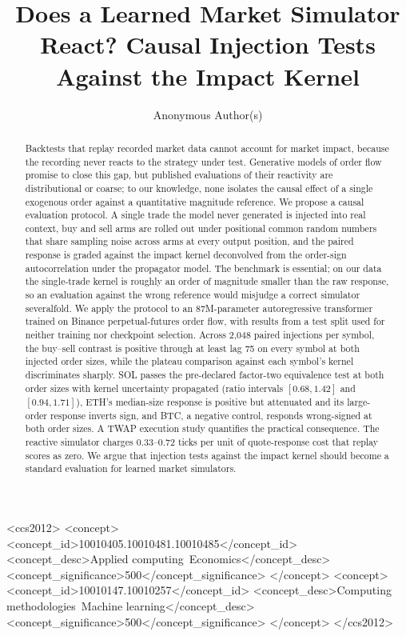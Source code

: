 \documentclass[sigconf,anonymous]{acmart}
\begin{document}
\title{Does a Learned Market Simulator React? Causal Injection Tests Against the Impact Kernel}

\author{Anonymous Author(s)}

\begin{abstract}
Backtests that replay recorded market data cannot account for market impact, because the recording never reacts to the strategy under test. Generative models of order flow promise to close this gap, but published evaluations of their reactivity are distributional or coarse; to our knowledge, none isolates the causal effect of a single exogenous order against a quantitative magnitude reference. We propose a causal evaluation protocol. A single trade the model never generated is injected into real context, buy and sell arms are rolled out under positional common random numbers that share sampling noise across arms at every output position, and the paired response is graded against the impact kernel deconvolved from the order-sign autocorrelation under the propagator model. The benchmark is essential; on our data the single-trade kernel is roughly an order of magnitude smaller than the raw response, so an evaluation against the wrong reference would misjudge a correct simulator severalfold. We apply the protocol to an 87M-parameter autoregressive transformer trained on Binance perpetual-futures order flow, with results from a test split used for neither training nor checkpoint selection. Across 2{,}048 paired injections per symbol, the buy--sell contrast is positive through at least lag 75 on every symbol at both injected order sizes, while the plateau comparison against each symbol's kernel discriminates sharply. SOL passes the pre-declared factor-two equivalence test at both order sizes with kernel uncertainty propagated (ratio intervals $[0.68, 1.42]$ and $[0.94, 1.71]$), ETH's median-size response is positive but attenuated and its large-order response inverts sign, and BTC, a negative control, responds wrong-signed at both order sizes. A TWAP execution study quantifies the practical consequence. The reactive simulator charges 0.33--0.72 ticks per unit of quote-response cost that replay scores as zero. We argue that injection tests against the impact kernel should become a standard evaluation for learned market simulators.
\end{abstract}

\begin{CCSXML}
<ccs2012>
<concept>
<concept_id>10010405.10010481.10010485</concept_id>
<concept_desc>Applied computing~Economics</concept_desc>
<concept_significance>500</concept_significance>
</concept>
<concept>
<concept_id>10010147.10010257</concept_id>
<concept_desc>Computing methodologies~Machine learning</concept_desc>
<concept_significance>500</concept_significance>
</concept>
</ccs2012>
\end{CCSXML}
\end{document}
